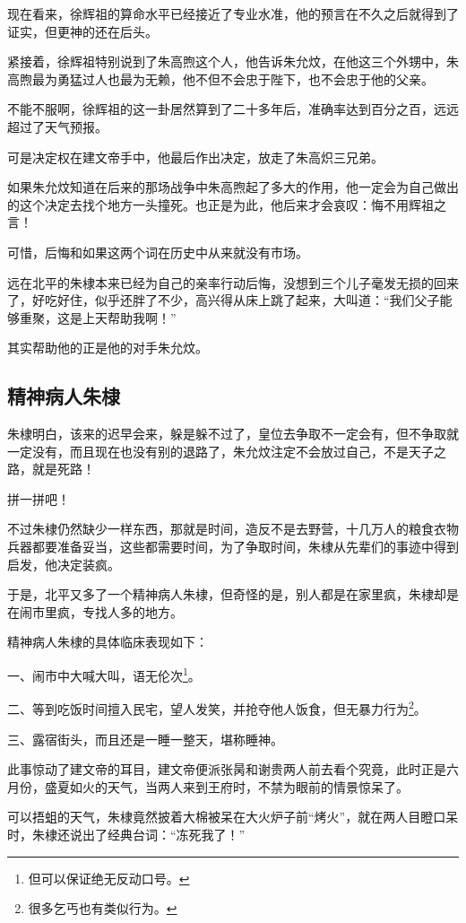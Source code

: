 \begin{multicols}{\theparacolNo}
		现在看来，徐辉祖的算命水平已经接近了专业水准，他的预言在不久之后就得到了证实，但更神的还在后头。

		紧接着，徐辉祖特别说到了朱高煦这个人，他告诉朱允炆，在他这三个外甥中，朱高煦最为勇猛过人也最为无赖，他不但不会忠于陛下，也不会忠于他的父亲。

		不能不服啊，徐辉祖的这一卦居然算到了二十多年后，准确率达到百分之百，远远超过了天气预报。

		可是决定权在建文帝手中，他最后作出决定，放走了朱高炽三兄弟。

		如果朱允炆知道在后来的那场战争中朱高煦起了多大的作用，他一定会为自己做出的这个决定去找个地方一头撞死。也正是为此，他后来才会哀叹：悔不用辉祖之言！

		可惜，后悔和如果这两个词在历史中从来就没有市场。

		远在北平的朱棣本来已经为自己的亲率行动后悔，没想到三个儿子毫发无损的回来了，好吃好住，似乎还胖了不少，高兴得从床上跳了起来，大叫道：“我们父子能够重聚，这是上天帮助我啊！”

		其实帮助他的正是他的对手朱允炆。

		\subsection{精神病人朱棣}
		朱棣明白，该来的迟早会来，躲是躲不过了，皇位去争取不一定会有，但不争取就一定没有，而且现在也没有别的退路了，朱允炆注定不会放过自己，不是天子之路，就是死路！

		拼一拼吧！

		不过朱棣仍然缺少一样东西，那就是时间，造反不是去野营，十几万人的粮食衣物兵器都要准备妥当，这些都需要时间，为了争取时间，朱棣从先辈们的事迹中得到启发，他决定装疯。

		于是，北平又多了一个精神病人朱棣，但奇怪的是，别人都是在家里疯，朱棣却是在闹市里疯，专找人多的地方。

		精神病人朱棣的具体临床表现如下：

		一、闹市中大喊大叫，语无伦次\footnote{但可以保证绝无反动口号。}。

		二、等到吃饭时间擅入民宅，望人发笑，并抢夺他人饭食，但无暴力行为\footnote{很多乞丐也有类似行为。}。

		三、露宿街头，而且还是一睡一整天，堪称睡神。

		此事惊动了建文帝的耳目，建文帝便派张昺和谢贵两人前去看个究竟，此时正是六月份，盛夏如火的天气，当两人来到王府时，不禁为眼前的情景惊呆了。

		可以捂蛆的天气，朱棣竟然披着大棉被呆在大火炉子前“烤火”，就在两人目瞪口呆时，朱棣还说出了经典台词：“冻死我了！”


\end{multicols}

